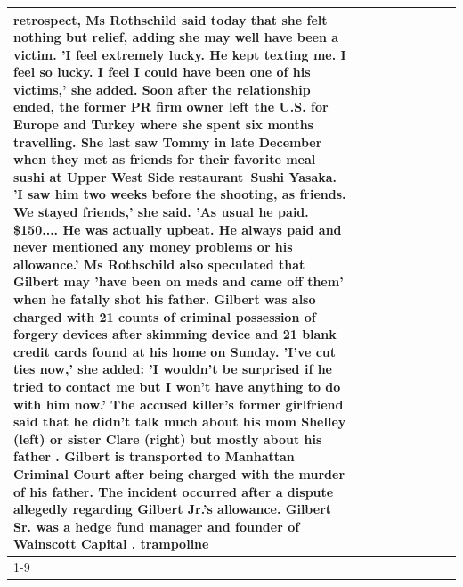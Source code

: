 \begin{table}[H]
\begin{tabular}{lllrlllll}
retrospect, Ms Rothschild said today that she felt nothing but relief, adding she may well have been a victim. 'I feel extremely lucky. He kept texting me. I feel so lucky. I feel I could have been one of his victims,' she added. Soon after the relationship ended, the former PR firm owner left the U.S. for Europe and Turkey where she spent six months  travelling. She last saw Tommy in late December when they met as friends for their favorite meal sushi at Upper West Side restaurant Sushi Yasaka. 'I saw him two weeks before the shooting, as friends. We stayed friends,' she said. 'As usual he paid. \$150.... He was actually upbeat. He always paid and never mentioned any money problems or his allowance.' Ms Rothschild also speculated that Gilbert may 'have been on meds and came off them' when he fatally shot his father. Gilbert was also charged with 21 counts of criminal possession of forgery devices after skimming device and 21 blank credit cards found at his home on Sunday. 'I've cut ties now,' she added: 'I wouldn’t be surprised if he tried to contact me but I won’t have anything to do with him now.' The accused killer's former girlfriend said that he didn't talk much about his mom Shelley (left) or sister Clare (right) but mostly about his father . Gilbert is transported to Manhattan Criminal Court  after being charged with the murder of his father. The incident occurred after a dispute allegedly regarding Gilbert Jr.'s allowance. Gilbert Sr. was a hedge fund manager and founder of Wainscott Capital . trampoline \\
\cline{1-9}

\end{tabular}
\end{table}
